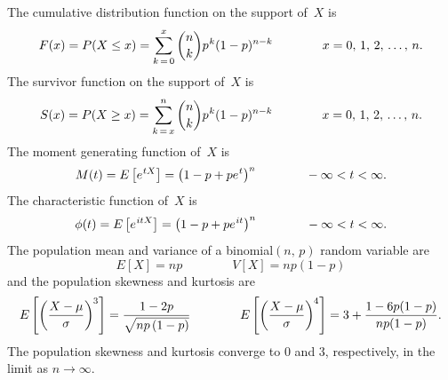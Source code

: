 \documentclass[12pt,fullpage]{article}
\begin{document}
\noindent
The cumulative distribution function on the support of~$X$ is
$$
F(x) = P(X \le x) = \sum_{k \, = \, 0}^x {n \choose k} p ^ {\kern 0.04em k} (1 - p) ^ {n - k} \qquad \qquad x = 0, \, 1, \, 2, \, \ldots, \, n.
$$
The survivor function on the support of~$X$ is
$$
S(x) = P(X \ge x) = \sum_{k \, = \, x}^n {n \choose k} p ^ {\kern 0.04em k} (1 - p) ^ {n - k} \qquad \qquad x = 0, \, 1, \, 2, \, \ldots, \, n.
$$
The moment generating function of~$X$ is
$$
M(t) = E\left[ e ^ {\kern 0.04em tX} \right] = \left( 1 - p + p e ^ {\kern 0.04em t} \right) ^ n \qquad \qquad -\infty < t < \infty.
$$
The characteristic function of~$X$ is
$$
\phi(t) = E\left[ e ^ {\kern 0.04em itX} \right] = \left( 1 - p + p e ^ {\kern 0.04em it} \right) ^n \qquad \qquad -\infty < t < \infty.
$$
The population mean and variance of a binomial$(n, \, p)$ random variable are 
$$
E[X] = np \qquad \qquad V[X] = np(1 - p) 
$$
and the population skewness and kurtosis are
$$
E\left[ \left( \frac{X - \mu}{\sigma} \right) ^  {\kern -0.04em 3} \right] = \frac{1-2p}{\sqrt{np\left(1-p\right)}} \qquad \qquad 
E\left[ \left( \frac{X - \mu}{\sigma} \right) ^  {\kern -0.04em 4} \right] = 3+\frac{1-6p(1-p)}{np(1-p)}.
$$
The population skewness and kurtosis converge to 0 and 3, respectively, in the limit as $n \rightarrow \infty$.\\

\vspace{-0.10in}
\end{document}
